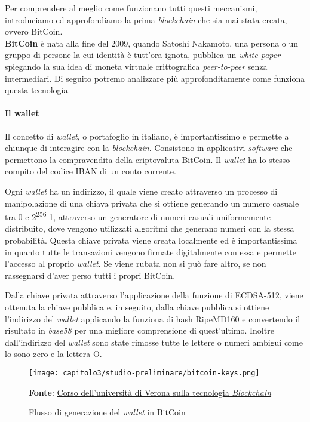 Per comprendere al meglio come funzionano tutti questi meccanismi, introduciamo ed approfondiamo la prima \textit{blockchain} che sia mai stata creata, ovvero BitCoin. \\

\textbf{BitCoin} è nata alla fine del 2009, quando Satoshi Nakamoto, una persona o un gruppo di persone la cui identità è tutt'ora ignota, pubblica un \textit{white paper} spiegando la sua idea di moneta virtuale crittografica \textit{peer-to-peer} senza intermediari. Di seguito potremo analizzare più approfonditamente come funziona questa tecnologia.

\paragraph{Il wallet}
Il concetto di \textit{wallet}, o portafoglio in italiano, è importantissimo e permette a chiunque di interagire con la \textit{blockchain}. Consistono in applicativi \textit{software} che permettono la compravendita della criptovaluta BitCoin. Il \textit{wallet} ha lo stesso compito del codice IBAN di un conto corrente.

Ogni \textit{wallet} ha un indirizzo, il quale viene creato attraverso un processo di manipolazione di una chiava privata che si ottiene generando un numero casuale tra 0 e 2\textsuperscript{256}-1, attraverso un generatore di numeri casuali uniformemente distribuito, dove vengono utilizzati algoritmi che generano numeri con la stessa probabilità. Questa chiave privata viene creata localmente ed è importantissima in quanto tutte le transazioni vengono firmate digitalmente con essa e permette l'accesso al proprio \textit{wallet}. Se viene rubata non si può fare altro, se non rassegnarsi d'aver perso tutti i propri BitCoin.

Dalla chiave privata attraverso l'applicazione della funzione di ECDSA-512, viene ottenuta la chiave pubblica e, in seguito, dalla chiave pubblica si ottiene l'indirizzo del \textit{wallet} applicando la funziona di hash RipeMD160 e convertendo il risultato in \textit{base58} per una migliore comprensione di quest'ultimo. Inoltre dall'indirizzo del \textit{wallet} sono state rimosse tutte le lettere o numeri ambigui come lo sono zero e la lettera O.

\begin{figure}[h!]
  \centering
  \texttt{[image: capitolo3/studio-preliminare/bitcoin-keys.png]}
  \caption{Flusso di generazione del \textit{wallet} in BitCoin}
  \textbf{Fonte}: \href{https://github.com/spoto/blockchain-course}{Corso dell'università di Verona sulla tecnologia \textit{Blockchain}} 
\end{figure}

